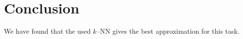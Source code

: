 
\section{Conclusion}
We have found that the used $k$--NN gives the best approximation for this task.